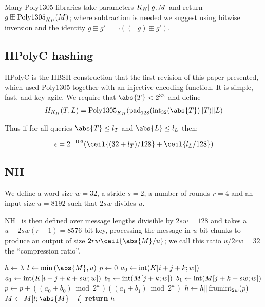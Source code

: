 \documentclass[eprint.tex]{subfiles}
\begin{document}
Many Poly1305 libraries
take parameters $K_H \Vert g, M$ and return $g \boxplus \operatorname{Poly1305}_{K_H}(M)$; where subtraction
is needed we suggest using bitwise inversion and the identity
$g \boxminus g' = \neg ((\neg g) \boxplus g')$.

\subsection{HPolyC hashing}
HPolyC is the HBSH construction that the first revision of this paper presented, which used
Poly1305 together with an injective encoding function.
It is simple, fast, and key agile. We require that $\abs{T} < 2^{32}$ and define
\begin{align*}
H_{K_H}(T, L) = \Polydjb_{K_H}(\pad_{128}(\intify_{32}(\abs{T}) \Concat T) \Concat L)
\end{align*}

Thus if for all queries $\abs{T} \leq l_T$ and $\abs{L} \leq l_L$ then:

\begin{displaymath}
\epsilon = 2^{-103}(\ceil{(32 + l_T)/128} + \ceil{l_L/128})
\end{displaymath}\label{hpolycepsilon}

\subsection{NH}\label{nh}

We define a word size $w = 32$, a stride $s = 2$,
a number of rounds $r = 4$ and an input size $u = 8192$ such that $2sw$ divides $u$.

NH~\cite{umac1,umac2,rfc4418} is then defined over message
lengths divisible by $2sw = 128$
and takes a $u + 2sw(r -1) = 8576$-bit key, processing the message
in $u$-bit chunks to produce
an output of size $2rw\ceil{\abs{M}/u}$; we call this ratio $u/2rw = 32$ the ``compression ratio''.

\begin{algorithmic}[0]
    \State $h \gets \lambda$
        \State $l \gets \min{(\abs{M}, u)}$
            \State $p \gets 0$
                    \State $a_0 \gets \operatorname{int}(K[i+j+k;w])$
                    \State $a_1 \gets \operatorname{int}(K[i+j+k+sw;w])$
                    \State $b_0 \gets \operatorname{int}(M[j+k;w])$
                    \State $b_1 \gets \operatorname{int}(M[j+k+sw;w])$
                    \State $p \gets p + ((a_0 + b_0) \bmod 2^w)((a_1 + b_1) \bmod 2^w)$
                \EndFor
            \EndFor
            \State $h \gets h \Vert \operatorname{fromint}_{2w}(p)$
        \EndFor
        \State $M \gets M[l;\abs{M} - l]$
    \EndWhile
    \State \textbf{return} $h$
    \EndProcedure
\end{algorithmic}
\end{document}
